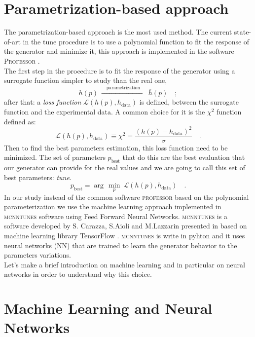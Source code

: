 \section{Parametrization-based approach}

The parametrization-based approach is the most used method. The current state-of-art in the tune procedure is to use a polynomial function to fit the response of the generator and minimize it, this approach is implemented in the software \textsc{Professor} \cite{Buckley:2009bj}. 
\\
The first step in the procedure is to fit the response of the generator using a surrogate function simpler to study than the real one,
\begin{equation}
	h(p)\ \xrightarrow{\quad \text{parametrization}\quad }\ \overline{h}(p)\quad ;
\end{equation}
after that: a \textit{loss function} $\mathcal{L}(h(p),h_{\text{data}})$ is defined, between the surrogate function and the experimental data. A common choice for it is the $\chi^2$ function defined as:
\begin{equation}
	\mathcal{L}(h(p),h_{\text{data}})\equiv \chi^2=\frac{(h(p)-h_{\text{data}})^2}{\sigma}\quad.
\end{equation}
Then to find the best parameters estimation, this loss function need to be minimized. The set of parameters $p_{\text{best}}$ that do this are the best evaluation that our generator can provide for the real values and we are going to call this set of best parameters: \textit{tune}.
\begin{equation}
	p_{\text{best}}=\arg\,\min_p\ \mathcal{L}(h(p),h_{\text{data}})\quad.
\end{equation}
In our study instead of the common software \textsc{professor} based on the polynomial parameterization we use the machine learning approach implemented in \textsc{mcnntunes} software \cite{MCNNTUNESonGitHub}
using Feed Forward Neural Networks. \textsc{mcnntunes} is a software developed by S. Carazza, S.Aioli and M.Lazzarin presented in \cite{MCNNTUNESarticle} based on machine learning library TensorFlow \cite{tensorflow2015-whitepaper}. \textsc{mcnntunes} is write in pyhton and it uses neural networks (NN) that are trained to learn the generator behavior to the parameters variations.
\\
Let's make a brief introduction on machine learning and in particular on neural networks in order to understand why this choice.

\section{Machine Learning and Neural Networks}
  
